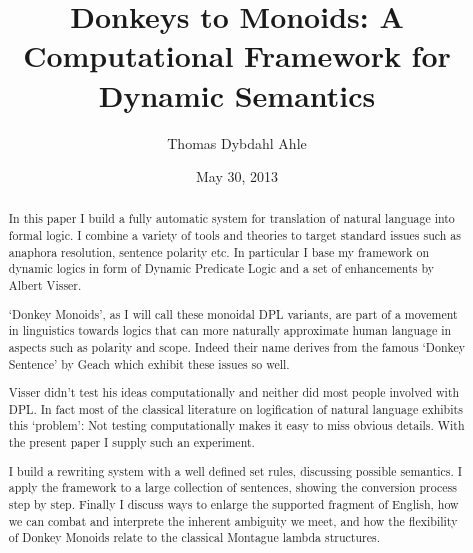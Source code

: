 \documentclass[12pt]{article}
\title{Donkeys to Monoids: A Computational Framework for Dynamic Semantics}
\author{Thomas Dybdahl Ahle}
\date{May 30, 2013}
\begin{document}
\maketitle

\begin{abstract}


In this paper I build a fully automatic system for translation of natural language into formal logic. I combine a variety of tools and theories to target standard issues such as anaphora resolution, sentence polarity etc. In particular I base my framework on dynamic logics in form of Dynamic Predicate Logic and a set of enhancements by Albert Visser\cite{visser1999donkey}.

`Donkey Monoids', as I will call these monoidal DPL variants, are part of a movement in linguistics towards logics that can more naturally approximate human language in aspects such as polarity and scope. Indeed their name derives from the famous `Donkey Sentence' by Geach\cite{geach1962reference} which exhibit these issues so well.

Visser didn't test his ideas computationally and neither did most people involved with DPL. In fact most of the classical literature on logification of natural language exhibits this `problem': Not testing computationally makes it easy to miss obvious details. With the present paper I supply such an experiment.

I build a rewriting system with a well defined set rules, discussing possible semantics. I apply the framework to a large collection of sentences, showing the conversion process step by step. Finally I discuss ways to enlarge the supported fragment of English, how we can combat and interprete the inherent ambiguity we meet, and how the flexibility of Donkey Monoids relate to the classical Montague lambda structures.

\end{abstract}
\end{document}
